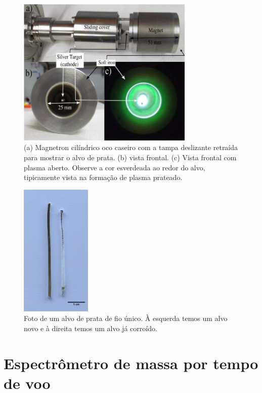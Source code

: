\begin{figure}
  \centering
  \includegraphics[width=0.75\textwidth]{images/magnetron_cil}
  \caption{ (a) Magnetron cilíndrico oco caseiro com a tampa deslizante retraída para mostrar o alvo de prata. (b) vista frontal. (c) Vista frontal com plasma aberto. Observe a cor esverdeada ao redor do alvo, tipicamente vista na formação de plasma prateado.\cite{livro_vitor} }
  \label{fig:magnetron}  
\end{figure}
\begin{figure}
  \centering
  \includegraphics[width=0.3\textwidth]{images/alvo}
  \caption{ Foto de um alvo de prata de fio único. À esquerda temos um alvo novo e à direita temos um alvo já corroído.  }
  \label{fig:alvo}
\end{figure}






\section{Espectrômetro de massa por tempo de voo}

